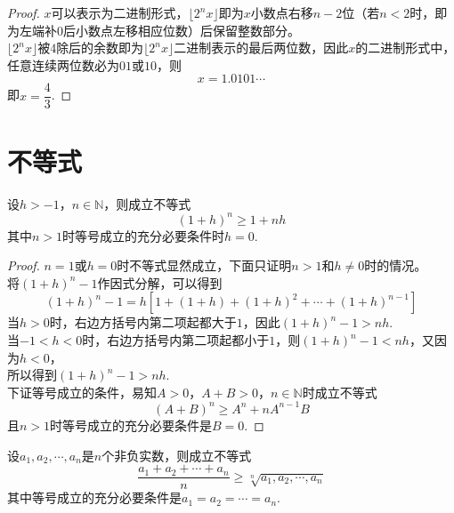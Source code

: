 \begin{proof}

    $x$可以表示为二进制形式，$\lfloor 2^n x \rfloor$即为$x$小数点右移$n - 2$位（若$n < 2$时，即为左端补$0$后小数点左移相应位数）后保留整数部分。\\
    $\lfloor 2^n x \rfloor$被$4$除后的余数即为$\lfloor 2^n x \rfloor$二进制表示的最后两位数，因此$x$的二进制形式中，任意连续两位数必为$01$或$10$，则
    \[x = 1.0101 \cdots\]
    即$x = \dfrac{4}{3}$.
    
\end{proof}

\section{不等式}

\begin{theorem}[Bernoulli不等式]

    设$h > -1$，$n \in \mathbb{N}$，则成立不等式
    \[(1 + h)^n \geq 1 + nh\]
    其中$n > 1$时等号成立的充分必要条件时$h = 0$.

\end{theorem}

\begin{proof}
    
    $n = 1$或$h = 0$时不等式显然成立，下面只证明$n > 1$和$h\neq 0$时的情况。\\
    将$(1 + h)^n - 1$作因式分解，可以得到
    \[(1 + h)^n - 1 = h[1 + (1 + h) + (1 + h)^2 + \cdots + (1 + h)^{n - 1}]\]
    当$h > 0$时，右边方括号内第二项起都大于$1$，因此$(1 + h)^n - 1 > nh$. \\
    当$-1 < h < 0$时，右边方括号内第二项起都小于$1$，则$(1 + h)^n - 1 < nh$，又因为$h < 0$，\\
    所以得到$(1 + h)^n - 1 > nh$. \\
    下证等号成立的条件，易知$A > 0$，$A + B > 0$，$n \in \mathbb{N}$时成立不等式
    \[(A + B)^n \geq A^n + nA^{n - 1}B\]
    且$n > 1$时等号成立的充分必要条件是$B = 0$.

\end{proof}

\begin{theorem}
    
    设$a_1, a_2, \cdots, a_n$是$n$个非负实数，则成立不等式
    \[\dfrac{a_1 + a_2 + \cdots + a_n}{n} \geq \sqrt[n]{a_1, a_2, \cdots, a_n}\]
    其中等号成立的充分必要条件是$a_1 = a_2 = \cdots = a_n$.

\end{theorem}

